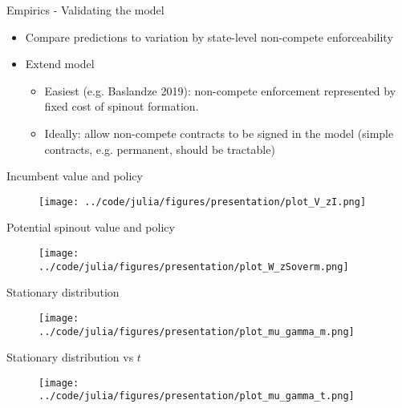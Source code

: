 \documentclass[english,usenames,dvipsnames]{beamer}
\begin{document}
\begin{frame}{Empirics - Validating the model}
\begin{itemize}
	\item Compare predictions to variation by state-level non-compete enforceability
	\item Extend model
	\begin{itemize}
		\item Easiest (e.g. Baslandze 2019): non-compete enforcement represented by fixed cost of spinout formation.
		\item Ideally: allow non-compete contracts to be signed in the model (simple contracts, e.g. permanent, should be tractable)
	\end{itemize}
\end{itemize}
\end{frame}

\appendix

\begin{frame}[label = incumbent_value]{Incumbent value and policy}\hyperlink{innovation_rates}{}
\begin{figure}
	\texttt{[image: ../code/julia/figures/presentation/plot\_V\_zI.png]}
\end{figure}
\end{frame}

\begin{frame}[label = spinout_value]{Potential spinout value and policy}\hyperlink{innovation_rates}{}
\begin{figure}
\texttt{[image: ../code/julia/figures/presentation/plot\_W\_zSoverm.png]}
\end{figure}
\end{frame}

\begin{frame}[label = stationary_distribution_m]{Stationary distribution}\hyperlink{innovation_rates}{}
\begin{figure}
\texttt{[image: ../code/julia/figures/presentation/plot\_mu\_gamma\_m.png]}
\end{figure}
\end{frame}

\begin{frame}[label = stationary_distribution_t]{Stationary distribution vs $t$}\hyperlink{innovation_rates}{}
\begin{figure}
\texttt{[image: ../code/julia/figures/presentation/plot\_mu\_gamma\_t.png]}
\end{figure}
\end{frame}
\end{document}
